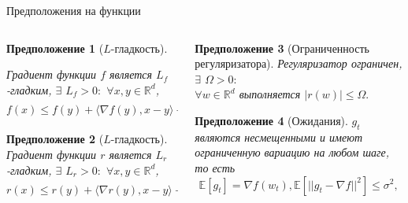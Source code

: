 \documentclass[aspectratio=169, 12pt]{beamer}
\newtheorem{assumption_rus}{Предположение}
\begin{document}
\begin{frame}{Предположения на функции}
     \begin{columns}[t]
    \begin{column}{0.48\textwidth}
        \vspace{-0.6cm}
        \begin{assumption_rus}[$L$-гладкость]
\label{ass:smoothness}

    Градиент функции $f$ является $L_f$-гладким, $\exists$ $L_f > 0:$ $\forall x, y \in \mathbb{R}^d$,
    	\begin{equation*}
    		f(x) \leq f(y) + \langle \nabla f(y), x-y \rangle + \frac{L_f}{2} \|x - y\|^2.
    	\end{equation*}
     \end{assumption_rus}
     \begin{assumption_rus}[$L$-гладкость]
    Градиент функции $r$ является $L_r$-гладким, $\exists$ $L_r > 0:$ $\forall x, y \in \mathbb{R}^d$,
	\begin{equation*}
		r(x) \leq r(y) + \langle \nabla r(y), x-y \rangle + \frac{L_r}{2} ||x - y||^2.
	\end{equation*}
\end{assumption_rus}
    \end{column}
    \hspace{0.5cm}
    \vrule
    \hspace{0.8cm}
    \begin{column}{0.48\textwidth}
    \vspace{-0.5cm}
        \begin{assumption_rus}[Ограниченность регуляризатора]
\label{ass:regbound}
Регуляризатор ограничен, $\exists$ $\Omega > 0:$ \\ 
$\forall w \in \mathbb{R}^d$ выполняется $ |r(w)| \le \Omega.$
\end{assumption_rus}
\begin{assumption_rus}[Ожидания]
$g_t$ являются несмещенными и имеют ограниченную вариацию на любом шаге, то есть
\begin{equation*}
\mathbb{E}\left[ g_t \right] = \nabla f (w_t), \mathbb{E}\left[ ||g_t - \nabla f||^2 \right] \leq \sigma^2,
\end{equation*}
\label{ass:expectations}
\end{assumption_rus}
    \end{column}
\end{columns}
\end{frame}
\end{document}
